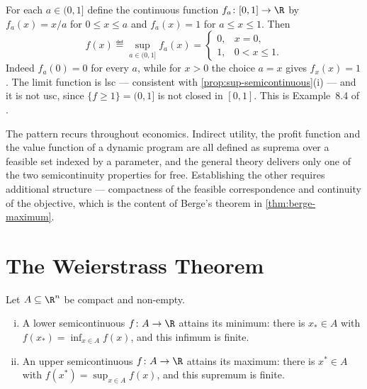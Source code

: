 \begin{eg}\label{eg:sup-not-usc}
	For each $a\in(0,1]$ define the continuous function $f_a\colon[0,1]\to\R$ by
	$f_a(x)=x/a$ for $0\leq x\leq a$ and $f_a(x)=1$ for $a\leq x\leq1$. Then
	\[
		f(x)\eqdef\sup_{a\in(0,1]}f_a(x)=
		\begin{cases}
			0, & x=0,          \\
			1, & 0<x\leq1 .
		\end{cases}
	\]
	Indeed $f_a(0)=0$ for every $a$, while for $x>0$ the choice $a=x$ gives
	$f_x(x)=1$. The limit function is lsc --- consistent with
	\autoref{prop:sup-semicontinuous}(i) --- and it is not usc, since
	$\{f\geq1\}=(0,1]$ is not closed in $[0,1]$. This is Example~8.4 of
	\textcite[p.~272]{fukuda2026notes}.

	The pattern recurs throughout economics. Indirect utility, the profit function
	and the value function of a dynamic program are all defined as suprema over a
	feasible set indexed by a parameter, and the general theory delivers only one of
	the two semicontinuity properties for free. Establishing the other requires
	additional structure --- compactness of the feasible correspondence and
	continuity of the objective, which is the content of Berge's theorem in
	\autoref{thm:berge-maximum}.
\end{eg}

\section{The Weierstrass Theorem}\label{sec:cont-weierstrass}

\begin{theorem}[Weierstrass]\label{thm:weierstrass}
	Let $A\subseteq\R^n$ be compact and non-empty.
	\begin{enumerate}[(i)]
		\item A lower semicontinuous $f\colon A\to\R$ attains its minimum: there is
		      $x_\ast\in A$ with $f(x_\ast)=\inf_{x\in A}f(x)$, and this infimum is
		      finite.
		\item An upper semicontinuous $f\colon A\to\R$ attains its maximum: there is
		      $x^\ast\in A$ with $f(x^\ast)=\sup_{x\in A}f(x)$, and this supremum is
		      finite.
	\end{enumerate}
\end{theorem}

